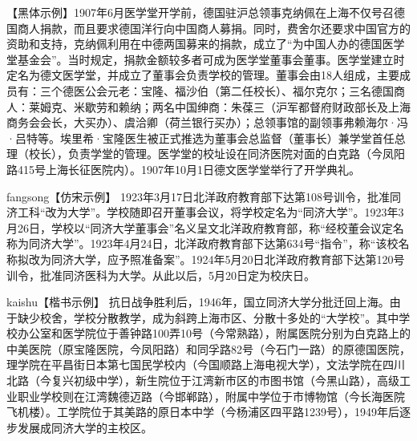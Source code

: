 {\heiti 【黑体示例】1907年6月医学堂开学前，德国驻沪总领事克纳佩在上海不仅号召德国商人捐款，而且要求德国洋行向中国商人募捐。同时，费舍尔还要求中国官方的资助和支持，克纳佩利用在中德两国募来的捐款，成立了“为中国人办的德国医学堂基金会”。当时规定，捐款金额较多者可成为医学堂董事会董事。医学堂建立时定名为德文医学堂，并成立了董事会负责学校的管理。董事会由18人组成，主要成员有：三个德医公会元老：宝隆、福沙伯（第二任校长）、福尔克尔；三名德国商人：莱姆克、米歇劳和赖纳；两名中国绅商：朱葆三（沪军都督府财政部长及上海商务会会长，大买办）、虞洽卿（荷兰银行买办）；总领事馆的副领事弗赖海尔·冯·吕特等。埃里希·宝隆医生被正式推选为董事会总监督（董事长）兼学堂首任总理（校长），负责学堂的管理。医学堂的校址设在同济医院对面的白克路（今凤阳路415号上海长征医院内）。1907年10月1日德文医学堂举行了开学典礼。}

{\ifcsname fangsong\endcsname\fangsong【仿宋示例】\else[无 \cs{fangsong} 字体。]\fi
1923年3月17日北洋政府教育部下达第108号训令，批准同济工科“改为大学”。学校随即召开董事会议，将学校定名为“同济大学”。1923年3月26日，学校以“同济大学董事会”名义呈文北洋政府教育部，称“经校董会议定名称为同济大学”。1923年4月24日，北洋政府教育部下达第634号“指令”，称“该校名称拟改为同济大学，应予照准备案”。1924年5月20日北洋政府教育部下达第120号训令，批准同济医科为大学。从此以后，5月20日定为校庆日。}

{\ifcsname kaishu\endcsname\kaishu【楷书示例】\else[无 \cs{kaishu} 字体。]\fi
抗日战争胜利后，1946年，国立同济大学分批迁回上海。由于缺少校舍，学校分散教学，成为斜跨上海市区、分散十多处的“大学校”。其中学校办公室和医学院位于善钟路100弄10号（今常熟路），附属医院分别为白克路上的中美医院（原宝隆医院，今凤阳路）和同孚路82号（今石门一路）的原德国医院，理学院在平昌街日本第七国民学校内（今国顺路上海电视大学），文法学院在四川北路（今复兴初级中学），新生院位于江湾新市区的市图书馆（今黑山路），高级工业职业学校则在江湾魏德迈路（今邯郸路），附属中学位于市博物馆（今长海医院飞机楼）。工学院位于其美路的原日本中学（今杨浦区四平路1239号），1949年后逐步发展成同济大学的主校区。}

